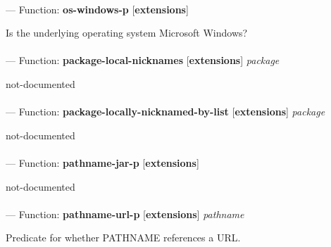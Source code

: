 \paragraph{}
\label{EXTENSIONS:OS-WINDOWS-P}
--- Function: \textbf{os-windows-p} [\textbf{extensions}] \textit{}

\begin{adjustwidth}{5em}{5em}
Is the underlying operating system Microsoft Windows?
\end{adjustwidth}

\paragraph{}
\label{EXTENSIONS:PACKAGE-LOCAL-NICKNAMES}
--- Function: \textbf{package-local-nicknames} [\textbf{extensions}] \textit{package}

\begin{adjustwidth}{5em}{5em}
not-documented
\end{adjustwidth}

\paragraph{}
\label{EXTENSIONS:PACKAGE-LOCALLY-NICKNAMED-BY-LIST}
--- Function: \textbf{package-locally-nicknamed-by-list} [\textbf{extensions}] \textit{package}

\begin{adjustwidth}{5em}{5em}
not-documented
\end{adjustwidth}

\paragraph{}
\label{EXTENSIONS:PATHNAME-JAR-P}
--- Function: \textbf{pathname-jar-p} [\textbf{extensions}] \textit{}

\begin{adjustwidth}{5em}{5em}
not-documented
\end{adjustwidth}

\paragraph{}
\label{EXTENSIONS:PATHNAME-URL-P}
--- Function: \textbf{pathname-url-p} [\textbf{extensions}] \textit{pathname}

\begin{adjustwidth}{5em}{5em}
Predicate for whether PATHNAME references a URL.
\end{adjustwidth}

